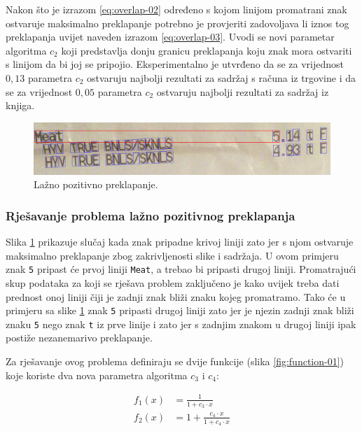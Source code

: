 \documentclass[times, utf8, zavrsni]{fer}
\begin{document}
Nakon što je izrazom \ref{eq:overlap-02} određeno s kojom linijom promatrani
znak ostvaruje maksimalno preklapanje potrebno je provjeriti zadovoljava li iznos
tog preklapanja uvijet naveden izrazom \ref{eq:overlap-03}. Uvodi se novi
parametar algoritma $c_2$ koji predstavlja donju granicu preklapanja koju znak
mora ostvariti s linijom da bi joj se pripojio. Eksperimentalno je utvrđeno da
se za vrijednost $0{,}13$ parametra $c_2$ ostvaruju najbolji rezultati za
sadržaj s računa iz trgovine i da se za vrijednost $0{,}05$ parametra $c_2$
ostvaruju najbolji rezultati za sadržaj iz knjiga.

\begin{figure}[htb]
    \centering
    \captionsetup{justification=centering,margin=2cm}
    \includegraphics[width=\textwidth]{images/overlap-02.png}
    \caption{Lažno pozitivno preklapanje.}
    \label{fig:overlap-02}
\end{figure}


\subsubsection{Rješavanje problema lažno pozitivnog preklapanja}
Slika \ref{fig:overlap-02} prikazuje slučaj kada znak pripadne krivoj liniji
zato jer s njom ostvaruje maksimalno preklapanje zbog zakrivljenosti slike i
sadržaja. U ovom primjeru znak \lstinline{5} pripast će prvoj liniji
\lstinline{Meat}, a trebao bi pripasti drugoj liniji. Promatrajući skup
podataka za koji se rješava problem zaključeno je kako uvijek treba dati
prednost onoj liniji čiji je zadnji znak bliži znaku kojeg promatramo. Tako će
u primjeru sa slike \ref{fig:overlap-02} znak \lstinline{5} pripasti drugoj
liniji zato jer je njezin zadnji znak bliži znaku \lstinline{5} nego znak
\lstinline{t} iz prve linije i zato jer s zadnjim znakom u drugoj liniji ipak
postiže nezanemarivo preklapanje.

Za rješavanje ovog problema definiraju se dvije funkcije (slika
\ref{fig:function-01})
koje koriste dva nova parametra algoritma $c_3$ i $c_4$:

\begin{align}
f_1(x) &= \frac{1}{1 + c_3 \cdot x} \\[10pt]
f_2(x) &= 1 + \frac{c_4 \cdot x}{1 + c_4 \cdot x}
\end{align}
\end{document}
